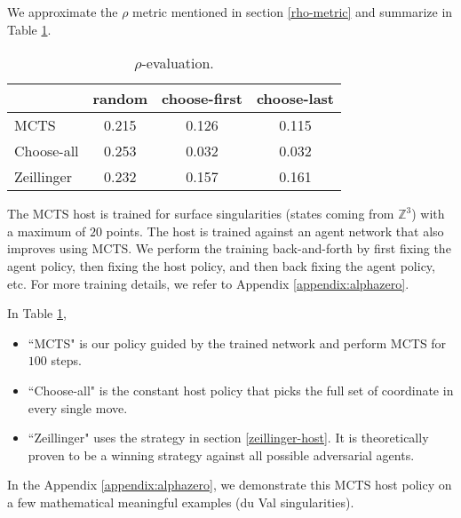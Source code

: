 \documentclass{article}
\theoremstyle{plain}
\theoremstyle{definition}
\theoremstyle{remark}
\begin{document}
We approximate the $\rho$ metric mentioned in section \ref{rho-metric} and summarize in Table \ref{eval}.
\begin{table}[t]
\caption{$\rho$-evaluation.}
\label{eval}
\vskip 0.1in
\begin{center}
\begin{small}
    \begin{tabular}{l|ccc}
         & random & choose-first & choose-last \\
         \midrule
         MCTS & 0.215 & 0.126 & 0.115 \\
         Choose-all & 0.253 & 0.032 & 0.032 \\
         Zeillinger & 0.232 & 0.157 & 0.161 \\
         \bottomrule
    \end{tabular}
\end{small}
\end{center}
\vskip -0.1in
\end{table}

The MCTS host is trained for surface singularities (states coming from $\mathbb Z^3$) with a maximum of $20$ points. The host is trained against an agent network that also improves using MCTS. We perform the training back-and-forth by first fixing the agent policy, then fixing the host policy, and then back fixing the agent policy, etc. 
For more training details, we refer to Appendix \ref{appendix:alphazero}.

In Table \ref{eval},
\begin{itemize}
    \item ``MCTS" is our policy guided by the trained network and perform MCTS for $100$ steps.
    \item ``Choose-all" is the constant host policy that picks the full set of coordinate in every single move.
    \item ``Zeillinger" uses the strategy in section \ref{zeillinger-host}. It is theoretically proven to be a winning strategy against all possible adversarial agents.
\end{itemize}

In the Appendix \ref{appendix:alphazero}, we demonstrate this MCTS host policy on a few mathematical meaningful examples (du Val singularities).
\end{document}
